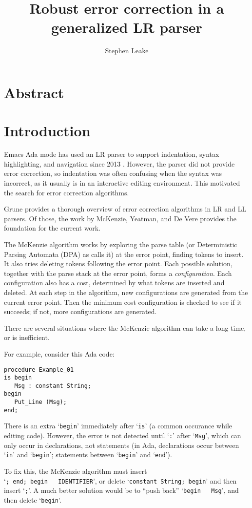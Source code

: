 \documentclass{article}
\title{Robust error correction in a generalized LR parser}
\author{Stephen Leake}
\newcommand{\code}[1]{`\lstinline|#1|'}
\begin{document}
\section{Abstract}

\section{Introduction}
Emacs Ada mode has used an LR parser to support indentation, syntax
highlighting, and navigation since 2013 \cite{Emacs Ada mode news}.
However, the parser did not provide error correction, so indentation
was often confusing when the syntax was incorrect, as it usually is in
an interactive editing environment. This motivated the search for
error correction algorithms.

Grune \cite{Grune 2008} provides a thorough overview of error
correction algorithms in LR and LL parsers. Of those, the work by
McKenzie, Yeatman, and De Vere \cite{McKenzie 1995} provides the
foundation for the current work.

The McKenzie algorithm works by exploring the parse table (or
Deterministic Parsing Automata (DPA) as \cite{McKenzie 1995} calls it)
at the error point, finding tokens to insert. It also tries deleting
tokens following the error point. Each possible solution, together
with the parse stack at the error point, forms a
\textit{configuration}. Each configuration also has a cost, determined
by what tokens are inserted and deleted. At each step in the
algorithm, new configurations are generated from the current error
point. Then the minimum cost configuration is checked to see if it
succeeds; if not, more configurations are generated.

There are several situations where the McKenzie algorithm can take a
long time, or is inefficient.

For example, consider this Ada code:
\begin{lstlisting}
procedure Example_01
is begin
   Msg : constant String;
begin
   Put_Line (Msg);
end;
\end{lstlisting}

There is an extra \code{begin} immediately after \code{is} (a common
occurance while editing code). However, the error is not detected
until \code{:} after \code{Msg}, which can only occur in declarations,
not statements (in Ada, declarations occur between \code{in} and
\code{begin}; statements between \code{begin} and \code{end}).

To fix this, the McKenzie algorithm must insert\\ \code{; end; begin
  IDENTIFIER}, or delete \code{constant String; begin} and then insert
\code{;}. A much better solution would be to ``push back'' \code{begin
  Msg}, and then delete \code{begin}.
\end{document}
